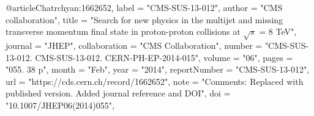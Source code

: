 @article{Chatrchyan:1662652,
      label          = "CMS-SUS-13-012",
      author        = "{CMS collaboration}",
      title         = "{Search for new physics in the multijet and missing
                       transverse momentum final state in proton-proton collisions
                       at $\sqrt{s}$ = 8 TeV}",
      journal       = "JHEP",
      collaboration = "CMS Collaboration",
      number        = "CMS-SUS-13-012. CMS-SUS-13-012. CERN-PH-EP-2014-015",
      volume        = "06",
      pages         = "055. 38 p",
      month         = "Feb",
      year          = "2014",
      reportNumber  = "CMS-SUS-13-012",
      url           = "https://cds.cern.ch/record/1662652",
      note          = "Comments: Replaced with published version. Added journal
                       reference and DOI",
      doi           = "10.1007/JHEP06(2014)055",
}

